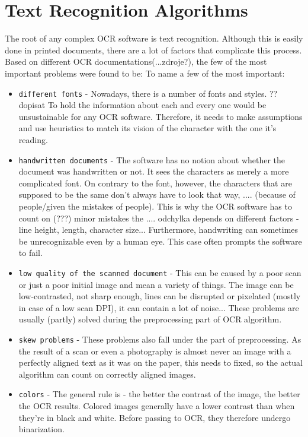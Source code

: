 \chapter{Text Recognition Algorithms}

The root of any complex OCR software is text recognition.
Although this is easily done in printed documents, there are a lot of factors that complicate this process.
Based on different OCR documentations(...zdroje?), the few of the most important problems were found to be:
To name a few of the most important:
\begin{itemize}
\item\texttt{different fonts} - Nowadays, there is a number of fonts and styles. ?? dopisat To hold the information about each and every one would be unsustainable for any OCR software. Therefore, it needs to make assumptions and use heuristics to match its vision of the character with the one it's reading.
\item\texttt {handwritten documents} - The software has no notion about whether the document was handwritten or not. It sees the characters as merely a more complicated font. On contrary to the font, however, the characters that are supposed to be the same don't always have to look that way, .... (because of people/given the mistakes of people).  This is why the OCR software has to count on (???) minor mistakes the .... odchylka depends on different factors - line height, length, character size... Furthermore, handwriting can sometimes be unrecognizable even by a human eye. This case often prompts the software to fail.
\item\texttt {low quality of the scanned document} - This can be caused by a poor scan or just a poor initial image and mean a variety of things. The image can be low-contrasted, not sharp enough, lines can be disrupted or pixelated (mostly in case of a low scan DPI), it can contain a lot of noise... These problems are usually (partly) solved during the preprocessing part of OCR algorithm.
\item\texttt {skew problems} - These problems also fall under the part of preprocessing. As the result of a scan or even a photography is almost never an image with a perfectly aligned text as it was on the paper, this needs to fixed, so the actual algorithm can count on correctly aligned images.
\item\texttt {colors} - The general rule is - the better the contrast of the image, the better the OCR results. Colored images generally have a lower contrast than when they're in black and white. Before passing to OCR, they therefore undergo binarization.

\end{itemize}
